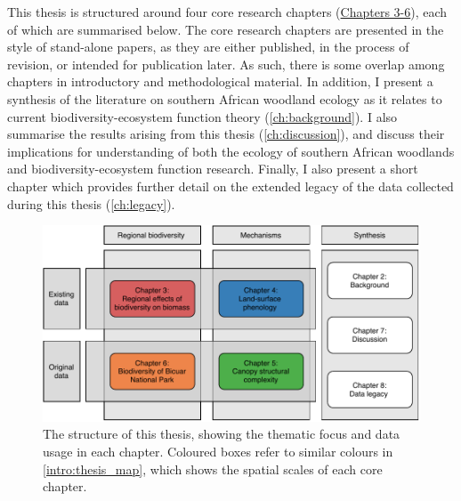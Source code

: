 \begin{refsection}
This thesis is structured around four core research chapters (\hyperref[ch:befr]{Chapters 3-6}), each of which are summarised below. The core research chapters are presented in the style of stand-alone papers, as they are either published, in the process of revision, or intended for publication later. As such, there is some overlap among chapters in introductory and methodological material. In addition, I present a synthesis of the literature on southern African woodland ecology as it relates to current biodiversity-ecosystem function theory (\autoref{ch:background}). I also summarise the results arising from this thesis (\autoref{ch:discussion}), and discuss their implications for understanding of both the ecology of southern African woodlands and biodiversity-ecosystem function research. Finally, I also present a short chapter which provides further detail on the extended legacy of the data collected during this thesis (\autoref{ch:legacy}). 

\begin{figure}
	\includegraphics[width=\linewidth]{img/thesis_struc}
	\caption[Thesis structure and data usage.]{The structure of this thesis, showing the thematic focus and data usage in each chapter. Coloured boxes refer to similar colours in \autoref{intro:thesis_map}, which shows the spatial scales of each core chapter.}
	\label{intro:thesis_struc}
\end{figure}


\end{refsection}
